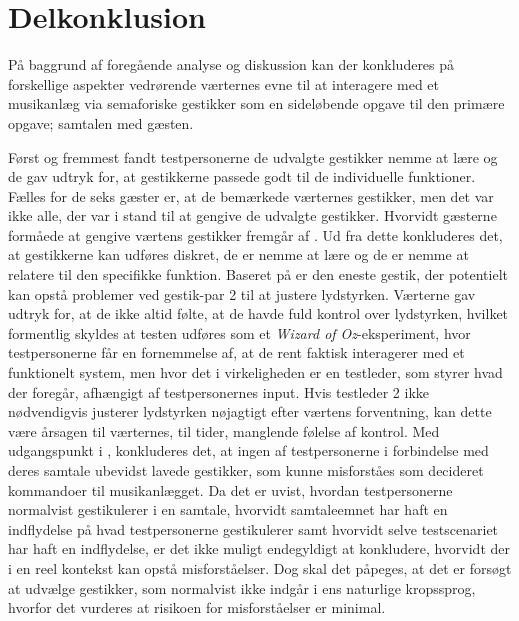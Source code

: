 \section{Delkonklusion}
\label{SocialAcceptDelkonklusion}
%
På baggrund af foregående analyse og diskussion kan der konkluderes på forskellige aspekter vedrørende værternes evne til at interagere med et musikanlæg via semaforiske gestikker som en sideløbende opgave til den primære opgave; samtalen med gæsten.

Først og fremmest fandt testpersonerne de udvalgte gestikker nemme at lære og de gav udtryk for, at gestikkerne passede godt til de individuelle funktioner. Fælles for de seks gæster er, at de bemærkede værternes gestikker, men det var ikke alle, der var i stand til at gengive de udvalgte gestikker. Hvorvidt gæsterne formåede at gengive værtens gestikker fremgår af . Ud fra dette konkluderes det, at gestikkerne kan udføres diskret, de er nemme at lære og de er nemme at relatere til den specifikke funktion. Baseret på  er den eneste gestik, der potentielt kan opstå problemer ved gestik-par 2 til at justere lydstyrken. Værterne gav udtryk for, at de ikke altid følte, at de havde fuld kontrol over lydstyrken, hvilket formentlig skyldes at testen udføres som et \textit{Wizard of Oz}-eksperiment, hvor testpersonerne får en fornemmelse af, at de rent faktisk interagerer med et funktionelt system, men hvor det i virkeligheden er en testleder, som styrer hvad der foregår, afhængigt af testpersonernes input. Hvis testleder 2 ikke nødvendigvis justerer lydstyrken nøjagtigt efter værtens forventning, kan dette være årsagen til værternes, til tider, manglende følelse af kontrol.\blankline
%    
Med udgangspunkt i , konkluderes det, at ingen af testpersonerne i forbindelse med deres samtale ubevidst lavede gestikker, som kunne misforståes som decideret kommandoer til musikanlægget. Da det er uvist, hvordan testpersonerne normalvist gestikulerer i en samtale, hvorvidt samtaleemnet har haft en indflydelse på hvad testpersonerne gestikulerer samt hvorvidt selve testscenariet har haft en indflydelse, er det ikke muligt endegyldigt at konkludere, hvorvidt der i en reel kontekst kan opstå misforståelser. Dog skal det påpeges, at det er forsøgt at udvælge gestikker, som normalvist ikke indgår i ens naturlige kropssprog, hvorfor det vurderes at risikoen for misforståelser er minimal.\blankline   
%
